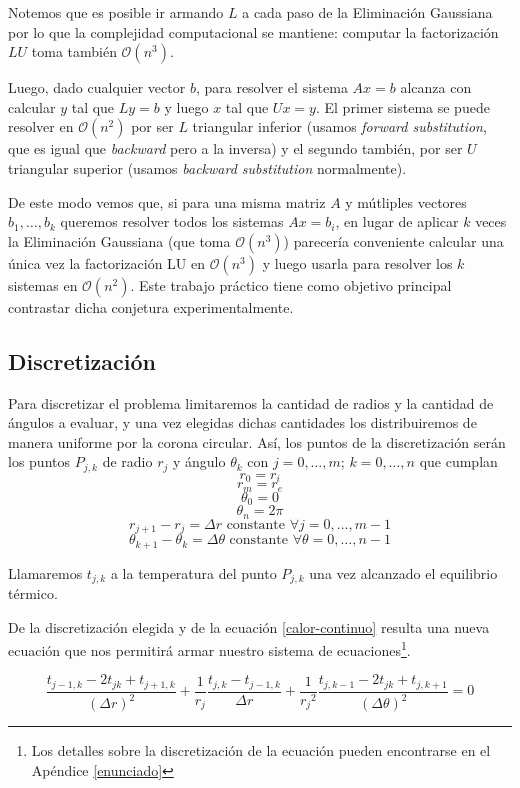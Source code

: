 Notemos que es posible ir armando $L$ a cada paso de la Eliminación Gaussiana por lo que la complejidad computacional se mantiene: computar la factorización $LU$ toma también $\mathcal{O}(n^3)$.

Luego, dado cualquier vector $b$, para resolver el sistema $Ax=b$ alcanza con calcular $y$ tal que $Ly=b$ y luego $x$ tal que $Ux=y$. El primer sistema se puede resolver en $\mathcal{O}(n^2)$ por ser $L$ triangular inferior (usamos \emph{forward substitution}, que es igual que \emph{backward} pero a la inversa) y el segundo también, por ser $U$ triangular superior (usamos \emph{backward substitution} normalmente).

De este modo vemos que, si para una misma matriz $A$ y mútliples vectores $b_1, \ldots, b_k$ queremos resolver todos los sistemas $Ax=b_i$, en lugar de aplicar $k$ veces la Eliminación Gaussiana (que toma $\mathcal{O}(n^3)$) parecería conveniente calcular una única vez la factorización LU en $\mathcal{O}(n^3)$ y luego usarla para resolver los $k$ sistemas en $\mathcal{O}(n^2)$. Este trabajo práctico tiene como objetivo principal contrastar dicha conjetura experimentalmente.

\subsection{Discretización}
Para discretizar el problema limitaremos la cantidad de radios y la cantidad de ángulos a evaluar, y una vez elegidas dichas cantidades los distribuiremos de manera uniforme por la corona circular. Así, los puntos de la discretización serán los puntos $P_{j,k}$ de radio $r_j$ y ángulo $\theta_k$ con $j = 0, \ldots, m$; $k = 0, \ldots, n$ que cumplan $$r_0 = r_i$$ $$r_m = r_e$$ $$\theta_0 = 0$$ $$\theta_n = 2\pi$$ $$r_{j+1}-r_{j} = \Delta r \text{ constante } \forall j = 0, \ldots, m-1$$ $$\theta_{k+1}-\theta_{k} = \Delta \theta \text{ constante } \forall \theta = 0, \ldots, n-1$$

Llamaremos $t_{j,k}$ a la temperatura del punto $P_{j,k}$ una vez alcanzado el equilibrio térmico.

De la discretización elegida y de la ecuación \ref{calor-continuo} resulta una nueva ecuación que nos permitirá armar nuestro sistema de ecuaciones\footnote{Los detalles sobre la discretización de la ecuación pueden encontrarse en el Apéndice \ref{enunciado}}.

\begin{equation}\label{calor}
\frac{t_{j-1,k}-2t_{jk}+t_{j+1,k}}{(\Delta r)^2}+\frac{1}{r_j}\frac{t_{j,k}-t_{j-1,k}}{\Delta r}+\frac{1}{{r_j}^2}\frac{t_{j,k-1}-2t_{jk}+t_{j,k+1}}{(\Delta \theta)^2} = 0 
\end{equation}

